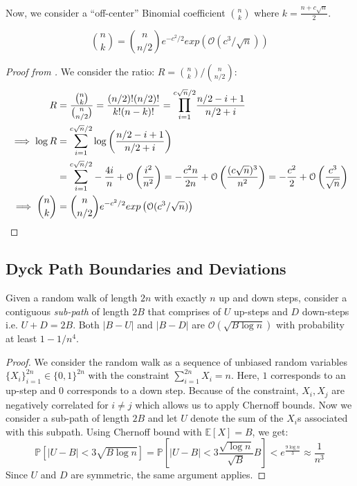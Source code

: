 Now, we consider a ``off-center'' Binomial coefficient $\binom{n}{k}$ where $k = \frac{n+c\sqrt n}{2}$.
\begin{lemma}
\label{lem:close_to_central_binomial_coefficient}
\[
\binom{n}{k} = \binom{n}{n/2} e^{-c^2/2}exp\left( \mathcal O(c^3/\sqrt n)\right)
\]
\end{lemma}
\begin{proof}[Proof from \cite{asymptopia}]
We consider the ratio: $R = \binom{n}{k}/\binom{n}{n/2}$:
\begin{align}
R &= \frac{\binom{n}{k}}{\binom{n}{n/2}}
= \frac{(n/2)!(n/2)!}{k!(n-k)!} = \mathlarger\prod\limits_{i=1}^{c\sqrt n/2}\frac{n/2-i+1}{n/2+i}\\
\implies \log R &= \mathlarger\sum\limits_{i=1}^{c\sqrt n/2}\log\left(\frac{n/2-i+1}{n/2+i} \right)\\
&= \mathlarger\sum\limits_{i=1}^{c\sqrt n/2} - \frac{4i}{n} + \mathcal O\left( \frac{i^2}{n^2}\right)
= - \frac{c^2n}{2n} + \mathcal O\left( \frac{(c\sqrt n)^3}{n^2}\right)
= - \frac{c^2}{2} + \mathcal O\left( \frac{c^3}{\sqrt n}\right)\\
\implies \binom{n}{k} &= \binom{n}{n/2} e^{-c^2/2}exp\left( \mathcal O(c^3/\sqrt n)\right)
\end{align}
\end{proof}



\subsection{Dyck Path Boundaries and Deviations}%
\label{sec:dyck_path_boundaries_and_deviations}
\begin{lemma}
\label{lem:random_walk_deviation_bound}
Given a random walk of length $2n$ with exactly $n$ up and down steps,
consider a contiguous \emph{sub-path} of length $2B$ that comprises of $U$ up-steps and $D$ down-steps i.e. $U + D = 2B$.
Both $|B-U|$ and $|B-D|$ are $\mathcal O(\sqrt{B\log n})$ with probability at least $1-1/n^4$.
\end{lemma}
\begin{proof}
We consider the random walk as a sequence of unbiased random variables $\{X_i\}_{i=1}^{2n}\in \{0,1\}^{2n}$
with the constraint $\sum\limits_{i=1}^{2n}X_i = n$.
Here, $1$ corresponds to an up-step and $0$ corresponds to a down step.
Because of the constraint, $X_i, X_j$ are negatively correlated for $i \not= j$ which allows us to apply Chernoff bounds.
Now we consider a sub-path of length $2B$ and let $U$ denote the sum of the $X_i$s associated with this subpath.
Using Chernoff bound with $\mathbb E[X] = B$, we get:
\[
\mathbb P\left[ |U-B| < 3\sqrt{B \log n}\right]
= \mathbb P\left[ |U-B| < 3\frac{\sqrt{\log n}}{\sqrt B}B\right] < e^{\frac{9\log n}{3}} \approx \frac{1}{n^3}
\]
Since $U$ and $D$ are symmetric, the same argument applies.
\end{proof}


